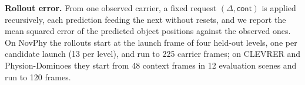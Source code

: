 \textbf{Rollout error.} From one observed carrier, a fixed request $(\Delta,\textsf{cont})$ is applied recursively, each prediction feeding the next without resets, and we report the mean squared error of the predicted object positions against the observed ones. On NovPhy the rollouts start at the launch frame of four held-out levels, one per candidate launch (13 per level), and run to 225 carrier frames; on CLEVRER and Physion-Dominoes they start from 48 context frames in 12 evaluation scenes and run to 120 frames.

